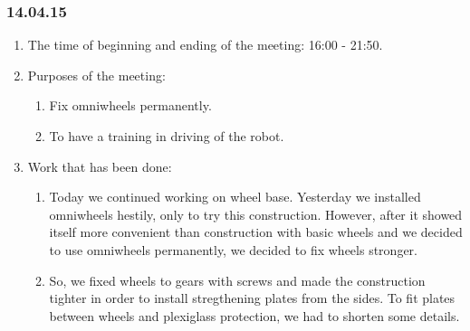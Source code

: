 \subsubsection{14.04.15}
\begin{enumerate}
	
	\item The time of beginning and ending of the meeting: 16:00 - 21:50.
	
	\item Purposes of the meeting: 
	\begin{enumerate}
		
		\item Fix omniwheels permanently.
		
		\item To have a training in driving of the robot.
		
	\end{enumerate}

	\item Work that has been done:
	\begin{enumerate}
		
		\item Today we continued working on wheel base. Yesterday we installed omniwheels hestily, only to try this construction. However, after it showed itself more convenient than construction with basic wheels and we decided to use omniwheels permanently, we decided to fix wheels stronger.
		
		\item So, we fixed wheels to gears with screws and made the construction tighter in order to install stregthening plates from the sides. To fit plates between wheels and plexiglass protection, we had to shorten some details.
		\begin{figure}[H]
			\begin{minipage}[h]{0.2\linewidth}
				\center  
			\end{minipage}
			\begin{minipage}[h]{0.6\linewidth}
				\caption{}
			\end{minipage}
		\end{figure}
		

\end{enumerate}
\end{enumerate}

